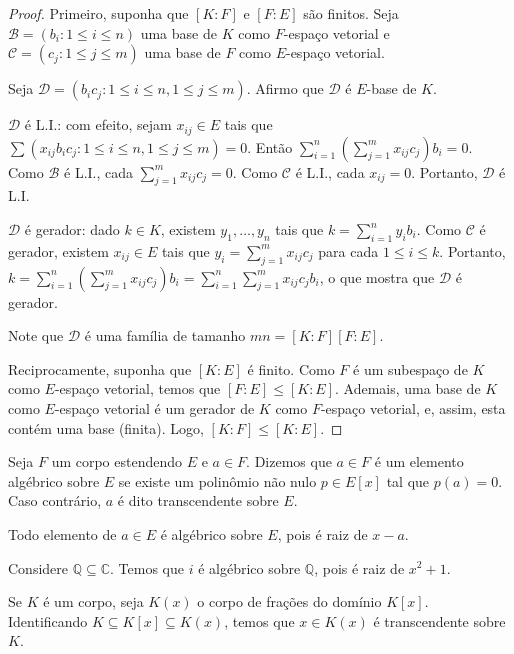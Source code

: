 \begin{proof}
    Primeiro, suponha que $[K:F]$ e $[F:E]$ são finitos. Seja $\mathcal B=(b_i: 1\leq i\leq n)$ uma base de $K$ como $F$-espaço vetorial e $\mathcal C=(c_j: 1\leq j\leq m)$ uma base de $F$ como $E$-espaço vetorial.

    Seja $\mathcal D=(b_ic_j: 1\leq i\leq n, 1\leq j\leq m)$. Afirmo que $\mathcal D$ é $E$-base de $K$.

    $\mathcal D$ é L.I.: com efeito, sejam $x_{ij}\in E$ tais que $\sum\left(x_{ij}b_ic_j: 1\leq i\leq n, 1\leq j\leq m\right)=0$. Então $\sum_{i=1}^n\left(\sum_{j=1}^mx_{ij}c_j\right)b_i=0$. Como $\mathcal B$ é L.I., cada $\sum_{j=1}^m x_{ij}c_j=0$. Como $\mathcal C$ é L.I., cada $x_{ij}=0$. Portanto, $\mathcal D$ é L.I.

    $\mathcal D$ é gerador: dado $k \in K$, existem $y_1, \dots, y_n$ tais que $k=\sum_{i=1}^n y_i b_i$. Como $\mathcal C$ é gerador, existem $x_{ij}\in E$ tais que $y_i=\sum_{j=1}^m x_{ij}c_j$ para cada $1\leq i\leq k$. Portanto, $k=\sum_{i=1}^n\left(\sum_{j=1}^mx_{ij}c_j\right)b_i=\sum_{i=1}^n\sum_{j=1}^mx_{ij}c_jb_i$, o que mostra que $\mathcal D$ é gerador.

    Note que $\mathcal D$ é uma família de tamanho $mn=[K:F][F:E]$.

    Reciprocamente, suponha que $[K:E]$ é finito. Como $F$ é um subespaço de $K$ como $E$-espaço vetorial, temos que $[F:E]\leq [K:E]$. Ademais, uma base de $K$ como $E$-espaço vetorial é um gerador de $K$ como $F$-espaço vetorial, e, assim, esta contém uma base (finita). Logo, $[K:F]\leq [K:E]$.
\end{proof}

\begin{definition}
Seja $F$ um corpo estendendo $E$ e $a \in F$. Dizemos que $a \in F$ é um elemento algébrico sobre $E$ se existe um polinômio não nulo $p \in E[x]$ tal que $p(a)=0$. Caso contrário, $a$ é dito transcendente sobre $E$.
\end{definition}

\begin{exemplo}
    Todo elemento de $a \in E$ é algébrico sobre $E$, pois é raiz de $x-a$.
\end{exemplo}

\begin{exemplo}
    Considere $\mathbb Q\subseteq \mathbb C$. Temos que $i$ é algébrico sobre $\mathbb Q$, pois é raiz de $x^2+1$.
\end{exemplo}

\begin{exemplo}
    Se $K$ é um corpo, seja $K(x)$ o corpo de frações do domínio $K[x]$. Identificando $K\subseteq K[x]\subseteq K(x)$, temos que $x \in K(x)$ é transcendente sobre $K$.
\end{exemplo}

